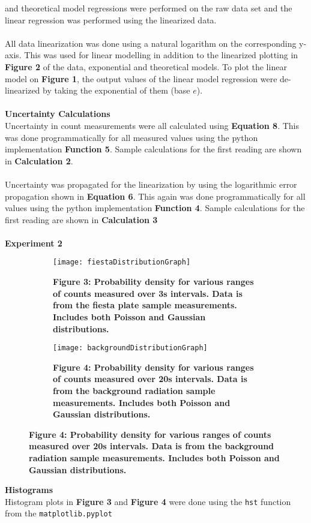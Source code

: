 \documentclass[
	letterpaper, %
	10pt, %
]{CSUniSchoolLabReport}
\begin{document}
and theoretical model regressions were performed on the raw data set and the linear regression was
performed using the linearized data.\\\\
All data linearization was done using a natural logarithm on the corresponding y-axis. This was used for
linear modelling in addition to the linearized plotting in \textbf{Figure 2} of the data, exponential and theoretical
models. To plot the linear model on \textbf{Figure 1}, the output values of the linear model regression were
de-linearized by taking the exponential of them (base $e$).\\\\
{\large\textbf{Uncertainty Calculations}}\\
Uncertainty in count measurements were all calculated using \textbf{Equation 8}. This was done programmatically
for all measured values using the python implementation \textbf{Function 5}. Sample calculations for the first reading
are shown in \textbf{Calculation 2}.\\\\
Uncertainty was propagated for the linearization by using the logarithmic error propagation shown in
\textbf{Equation 6}. This again was done programmatically for all values using the python implementation \textbf{Function 4}.
Sample calculations for the first reading are shown in \textbf{Calculation 3}\\\\
{\Large\textbf{Experiment 2}}
\begin{figure}[H]
	\begin{subfigure}{0.45\textwidth}
		\texttt{[image: fiestaDistributionGraph]}
		\caption{\textbf{Figure 3: Probability density for various ranges of counts measured over 3s intervals. Data is from the fiesta plate sample measurements. Includes both Poisson and Gaussian distributions. }}
	\end{subfigure}
	\quad
	\begin{subfigure}{0.45\textwidth}
		\texttt{[image: backgroundDistributionGraph]}
		\caption{\textbf{Figure 4: Probability density for various ranges of counts measured over 20s intervals. Data is from the background radiation sample measurements. Includes both Poisson and Gaussian distributions. }}
	\end{subfigure}
\end{figure}
{\large\textbf{Histograms}}\\
Histogram plots in \textbf{Figure 3} and \textbf{Figure 4} were done using the \lstinline{hst} function from the \lstinline{matplotlib.pyplot}
\end{document}
